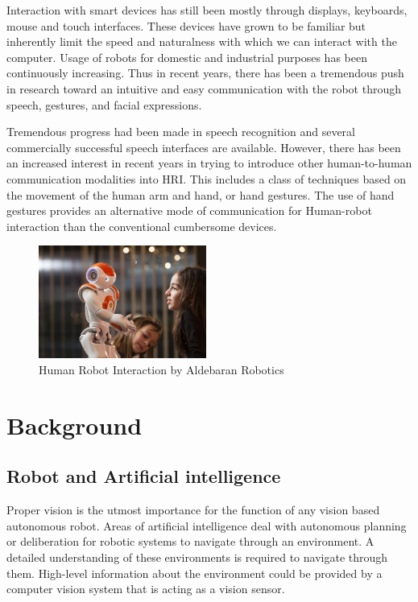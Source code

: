 Interaction with smart devices has still been mostly through displays, keyboards, mouse and touch interfaces. These devices have grown to be familiar but inherently limit the speed and naturalness with which we can interact with the computer.  Usage of robots for domestic and industrial purposes has been continuously increasing. Thus in recent years, there has been a tremendous push in research toward an intuitive and easy communication with the robot through speech, gestures, and facial expressions.

Tremendous progress had been made in speech recognition and several commercially successful speech interfaces are available. However, there has been an increased interest in recent years in trying to introduce other human-to-human communication modalities into HRI. This includes a class of techniques based on the movement of the human arm and hand, or hand gestures. The use of hand gestures provides an alternative mode of communication for Human-robot interaction than the conventional cumbersome devices.

\begin{figure}
	[h] \centering 
	\includegraphics[width=5.5cm]{figures/nao-interaction.png} 
	\caption{Human Robot Interaction by Aldebaran Robotics} 
	\label{fig:nao:interaction} 
\end{figure}

\chapter{Background} 
\section{Robot and Artificial intelligence} Proper vision is the utmost importance for the function of any vision based autonomous robot. Areas of artificial intelligence deal with autonomous planning or deliberation for robotic systems to navigate through an environment. A detailed understanding of these environments is required to navigate through them. High-level information about the environment could be provided by a computer vision system that is acting as a vision sensor.

